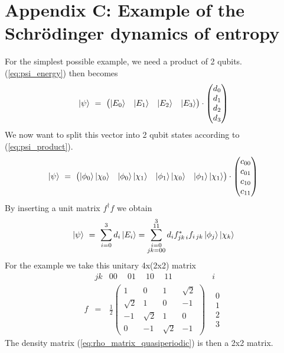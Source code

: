 \documentclass[12pt]{article}
\begin{document}
\section{Appendix C: Example of the Schrödinger dynamics of entropy}
For the simplest possible example, we need a product of 2 qubits.
(\ref{eq:psi_energy}) then becomes
\begin{equation*}
\ket{\psi}\ =\ \begin{pmatrix}
\ket{E_0} & \ket{E_1} & \ket{E_2} & \ket{E_3}
\end{pmatrix}
\cdot
\begin{pmatrix}
d_0 \\ d_1 \\ d_2 \\ d_3 
\end{pmatrix}
\end{equation*}
We now want to split this vector into 2 qubit states according to (\ref{eq:psi_product}).
\begin{equation*}
\ket{\psi}\ =\ \begin{pmatrix}
\ket{\phi_0}\ket{\chi_0} & \ket{\phi_0}\ket{\chi_1} & \ket{\phi_1}\ket{\chi_0} & \ket{\phi_1}\ket{\chi_1}
\end{pmatrix}
\cdot
\begin{pmatrix}
c_{00} \\ c_{01} \\ c_{10} \\ c_{11}
\end{pmatrix}
\end{equation*}
By inserting a unit matrix $ f^\dagger f$ we obtain
\begin{equation*}
\ket{\psi}\ =\ \sum_{i=0}^{3} d_i \ket{E_i} = \sum_{\substack{i=0\\jk=00}}^{\substack{3\\11}} d_i f_{jk\,i}^* f_{i\,jk} \ket{\phi_j}\ket{\chi_k}
\end{equation*}
For the example we take this unitary 4x(2x2) matrix
\begin{equation*}
\begin{matrix}
 & jk & 00\quad \ 01\quad \ 10\quad \ 11 & i \\
f & = & \frac{1}{2}
\begin{pmatrix}
\label{eq:f}
1 & 0 & 1 & \sqrt{2} \\
\sqrt{2} & 1 & 0 & -1 \\
-1 & \sqrt{2} & 1 & 0 \\
0 & -1 & \sqrt{2} & -1
\end{pmatrix} 
& \begin{matrix}0\\1\\2\\3\end{matrix}
\end{matrix}
\end{equation*}
The density matrix (\ref{eq:rho_matrix_quasiperiodic}) is then a 2x2 matrix.
\end{document}
